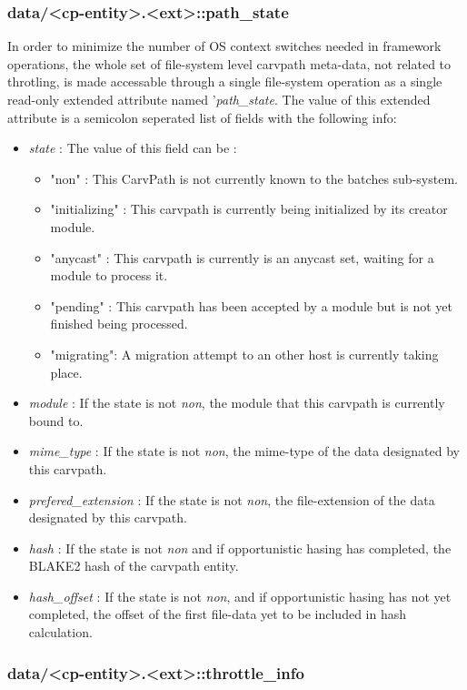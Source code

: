 \subsubsection{data/<cp-entity>.<ext>::path\_state}
In order to minimize the number of OS context switches needed in framework operations, the whole set of file-system level carvpath meta-data, not related to throtling, is made accessable through a single file-system operation as a single read-only extended attribute named '\emph{path\_state}. The value of this extended attribute is a semicolon seperated list of fields with the following info:
\begin{itemize}
\item \emph{state} : The value of this field can be :
\begin{itemize}
\item "non" : This CarvPath is not currently known to the batches sub-system. 
\item "initializing" : This carvpath is currently being initialized by its creator module.
\item "anycast" : This carvpath is currently is an anycast set, waiting for a module to process it.
\item "pending" : This carvpath has been accepted by a module but is not yet finished being processed.
\item "migrating": A migration attempt to an other host is currently taking place.
\end{itemize}
\item \emph{module} : If the state is not \emph{non}, the module that this carvpath is currently bound to.
\item \emph{mime\_type} : If the state is not \emph{non}, the mime-type of the data designated by this carvpath.
\item \emph{prefered\_extension} : If the state is not \emph{non}, the file-extension of the data designated by this carvpath.
\item \emph{hash} : If the state is not \emph{non} and if opportunistic hasing has completed, the BLAKE2 hash of the carvpath entity.
\item \emph{hash\_offset} : If the state is not \emph{non}, and if opportunistic hasing has not yet completed, the offset of the first file-data yet to be included in hash calculation.
\end{itemize}
\subsubsection{data/<cp-entity>.<ext>::throttle\_info}
